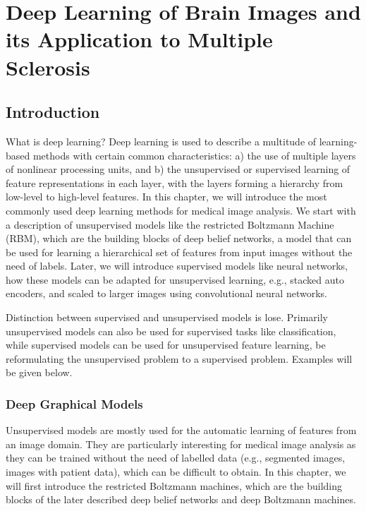 \documentclass{report}
\begin{document}
\chapter{Deep Learning of Brain Images and its Application to Multiple Sclerosis}

\section{Introduction}

What is deep learning? Deep learning is used to describe a multitude of
learning-based methods with certain common characteristics: a) the use of
multiple layers of nonlinear processing units, and b) the unsupervised or
supervised learning of feature representations in each layer, with the layers
forming a hierarchy from low-level to high-level features. In this chapter, we
will introduce the most commonly used deep learning methods for medical image
analysis. We start with a description of unsupervised models like the restricted
Boltzmann Machine (RBM), which are the building blocks of deep belief networks,
a model that can be used for learning a hierarchical set of features from input
images without the need of labels. Later, we will introduce supervised models
like neural networks, how these models can be adapted for unsupervised learning,
e.g., stacked auto encoders, and scaled to larger images using convolutional
neural networks.

Distinction between supervised and unsupervised models is lose. Primarily
unsupervised models can also be used for supervised tasks like classification,
while supervised models can be used for unsupervised feature learning, be
reformulating the unsupervised problem to a supervised problem. Examples will be
given below.

\subsection{Deep Graphical Models}

Unsupervised models are mostly used for the automatic learning of features from
an image domain. They are particularly interesting for medical image analysis as
they can be trained without the need of labelled data (e.g., segmented images,
images with patient data), which can be difficult to obtain. In this chapter, we
will first introduce the restricted Boltzmann machines, which are the building
blocks of the later described deep belief networks and deep Boltzmann machines.
\end{document}
